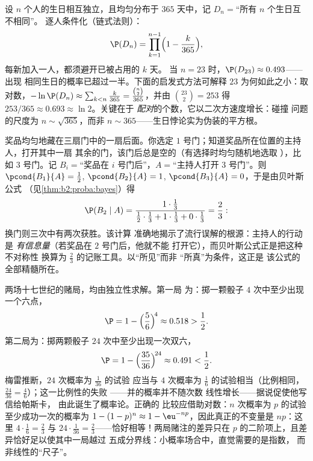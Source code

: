 \begin{example}\label{ex:b2:proba:birthday}
设 $n$ 个人的生日相互独立，且均匀分布于
$365$ 天中，记 $D_n = {}$“所有 $n$ 个生日互不相同”。
逐人条件化（链式法则）：
\[
\P(D_n) = \prod_{k=1}^{n-1}\Bigl(1 - \frac{k}{365}\Bigr),
\]
每新加入一人，都须避开已被占用的 $k$ 天。
当 $n = 23$ 时，$\P(D_{23}) \approx 0.493$——出现
相同生日的概率已超过一半。下面的启发式方法可解释
$23$ 为何如此之小：取对数，$-\ln
\P(D_n) \approx \sum_{k<n}\frac k{365} =
\frac{\binom n2}{365}$，并由 $\binom{23}2 = 253$ 得
$253/365 \approx 0.693 \approx \ln 2$。关键在于
\emph{配对}的个数，它以二次方速度增长：碰撞
问题的尺度为 $n \sim \sqrt{365}$，而非 $n \sim
365$——生日悖论实为伪装的平方根。
\end{example}

\begin{example}\label{ex:b2:proba:montyhall}
奖品均匀地藏在三扇门中的一扇后面。你选定
$1$ 号门；知道奖品所在位置的主持人，打开其中一扇
其余的门，该门后总是空的（有选择时均匀随机地选取
），比如 $3$ 号门。记 $B_i = {}$“奖品在
$i$ 号门后”，$A = {}$“主持人打开 $3$ 号门”。则
$\pcond{B_1}{A} = \frac12$, $\pcond{B_2}{A} = 1$,
$\pcond{B_3}{A} = 0$，于是由贝叶斯公式
（见\cref{thm:b2:proba:bayes}）得
\[
\P(B_2 \mid A)
= \frac{1\cdot\frac13}
{\frac12\cdot\frac13 + 1\cdot\frac13 + 0\cdot\frac13}
= \frac23 :
\]
换门则三次中有两次获胜。该计算
准确地揭示了流行误解的根源：主持人的行动是
\emph{有信息量}（若奖品在 $2$ 号门后，他就不能
打开它），而贝叶斯公式正是把这种不对称性
换算为 $\frac23$ 的记账工具。以“所见”而非
“所真”为条件，这正是
该公式的全部精髓所在。
\end{example}

\begin{example}[德·梅雷骑士的两个
赌局]\label{ex:b2:proba:demere}
两场十七世纪的赌局，均由独立性求解。第一局
为：掷一颗骰子 $4$ 次中至少出现一个六点，
\[
\P = 1 - \Bigl(\frac56\Bigr)^{\!4} \approx 0.518 > \frac12 .
\]
第二局为：掷两颗骰子 $24$ 次中至少出现一次双六，
\[
\P = 1 - \Bigl(\frac{35}{36}\Bigr)^{\!24} \approx 0.491 <
\frac12 .
\]
梅雷推断，$24$ 次概率为 $\frac1{36}$ 的试验
应当与 $4$ 次概率为 $\frac16$ 的试验相当（比例相同，
$\frac{24}{36} = \frac46$）；这一比例性的失败
——并的概率并不随次数
线性增长——据说促使他写信给帕斯卡，
由此诞生了概率论。正确的
比较应借助对数：$n$ 次概率为 $p$ 的试验
至少成功一次的概率为 $1 - (1-p)^n \approx
1 - \eu^{-np}$，因此真正的不变量是 $np$：这里
$4\cdot\frac16 = \frac23$ 与 $24\cdot\frac1{36} =
\frac23$——恰好相等！两局赌注的差异只在
$p$ 的二阶项上，且差异恰好足以使其中一局越过
五成分界线：小概率场合中，直觉需要的是指数，
而非线性的“尺子”。
\end{example}

